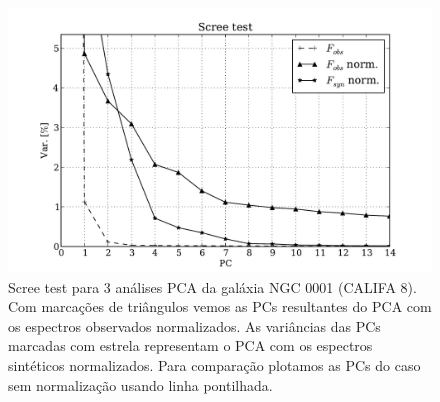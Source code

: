 \begin{figure}
    \includegraphics[height=0.33\textheight]{figuras/K0008-screetest.pdf}
    \caption[Scree test comparativo entre 3 PCAs - NGC 0001.]
    {Scree test para 3 análises PCA da galáxia NGC 0001 (CALIFA 8). Com marcações de triângulos vemos as PCs
    resultantes do PCA com os espectros observados normalizados. As variâncias das PCs marcadas com estrela representam
    o PCA com os espectros sintéticos normalizados. Para comparação plotamos as PCs do caso sem normalização usando
    linha pontilhada.}
    \label{fig:K0008scree}
\end{figure}

